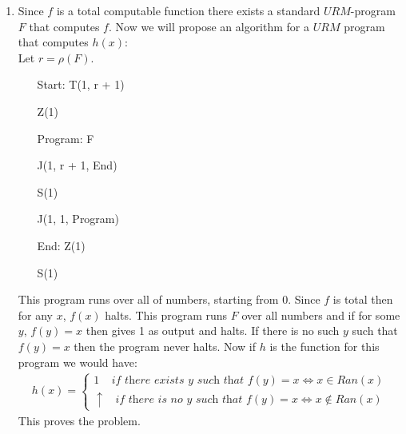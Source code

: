 \begin{enumerate}[label=]
    \item 
    Since $f$ is a total computable function there exists a standard $URM$-program $F$ that computes $f$.
    Now we will propose an algorithm for a $URM$ program that computes $h(x)$:\\
    Let $r = \rho(F)$. 
    \begin{center}
        \begin{itemize}
            \item[Start: ] T(1, r + 1)
            \item[] Z(1)
            \item[Program: ] F 
            \item[] J(1, r + 1, End)
            \item[] S(1)
            \item[] J(1, 1, Program)
            \item[End: ] Z(1)
            \item[] S(1)
        \end{itemize}
    \end{center}
    This program runs over all of numbers, starting from 0. Since $f$ is total then for any $x$, $f(x)$ halts. This program runs $F$ over all numbers and if for some $y$, $f(y) = x$ then gives 1 as output and halts. If there is no such $y$ such that $f(y) = x$ then the program never halts. Now if $h$ is the function for this program we would have:
    \begin{gather*}
        h(x) = \begin{cases}
            1 \ \ \ \ \ \textit{if there exists y such that } f(y) = x  \iff  x \in Ran(x) \\
            \uparrow \ \ \ \ \textit{if there is no y such that } f(y) = x \iff x \notin Ran(x)
        \end{cases}
    \end{gather*}
    This proves the problem.
\end{enumerate}